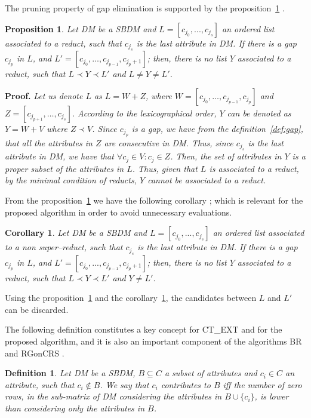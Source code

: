 \documentclass[number,preprint,review,12pt]{elsarticle}
\newtheorem{proposition}{Proposition}
\newtheorem{definition}{Definition}
\newtheorem{corollary}{Corollary}
\begin{document}
	The pruning property of gap elimination is supported by the proposition~\ref{prop:gap} \citep{Santiesteban03}. 
		
	\begin{proposition}\label{prop:gap} 
		Let DM be a SBDM and $L = [c_{j_0},...,c_{j_s}]$ an ordered list associated to a reduct, such that $c_{j_s}$ is the last attribute in DM. If there is a gap $c_{j_p}$ in $L$, and $L'=[c_{j_0},\dots,c_{j_{p-1}},c_{j_p+1}]$; then, there is no list $Y$ associated to a reduct, such that $L \prec Y \prec L'$ and $L \neq Y \neq L'$.
	\end{proposition}	
	
	\noindent
	\textbf{Proof.} \textit{\label{proof:gap} 
	Let us denote $L$ as $L=W+Z$, where $W=[c_{j_0},\dots,c_{j_{p-1}}, c_{j_p}]$ and $Z=[c_{j_{p+1}}, \dots, c_{j_s}]$. According to the lexicographical order, $Y$ can be denoted as $Y=W+V$ where $Z \prec V$. Since $c_{j_p}$ is a gap, we have from the definition~\ref{def:gap}, that all the attributes in $Z$ are consecutive in DM. Thus, since $c_{j_s}$ is the last attribute in DM, we have that $\forall c_j \in V: c_j \in Z$. Then, the set of attributes in $Y$ is a proper subset of the attributes in $L$. Thus, given that $L$ is associated to a reduct, by the minimal condition of reducts, $Y$ cannot be associated to a reduct.}
	
	From the proposition~\ref{prop:gap} we have the following corollary \citep{Santiesteban03}; which is relevant for the proposed algorithm in order to avoid unnecessary evaluations.
	
	\begin{corollary}\label{coro:gap} 
		Let DM be a SBDM and $L = [c_{j_0},...,c_{j_s}]$ an ordered list associated to a non super--reduct, such that $c_{j_s}$ is the last attribute in DM. If there is a gap $c_{j_p}$ in $L$, and $L' = [c_{j_0},...,c_{j_{p-1}},c_{j_p+1}]$; then, there is no list $Y$ associated to a reduct, such that $L \prec Y \prec L'$ and $Y \neq L'$.
	\end{corollary}
	
	Using the proposition~\ref{prop:gap} and the corollary~\ref{coro:gap}, the candidates between $L$ and $L'$ can be discarded.
		
	The following definition constitutes a key concept for CT\_EXT \citep{Sanchez07} and for the proposed algorithm, and it is also an important component of the algorithms BR \citep{Lias09} and RGonCRS \citep{WangP07}.
			
	\begin{definition}\label{def:contrib}
		Let DM be a SBDM, $B \subseteq C$ a subset of attributes and  $c_i \in C$ an attribute, such that $c_i \notin B$. We say that $c_i$ contributes to $B$ iff the	number of zero rows, in the sub-matrix of DM considering the attributes in $B\cup\{c_i\}$, is lower than considering only the attributes in $B$.
	\end{definition}
			
\end{document}
